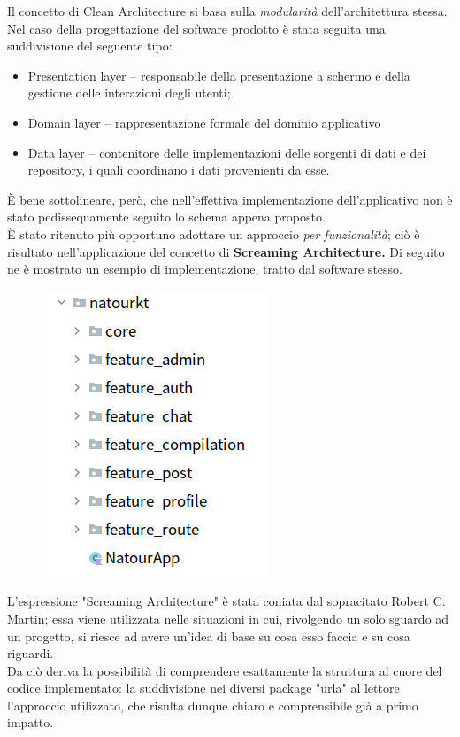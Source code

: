 \documentclass{natourDoc}
\begin{document}
Il concetto di Clean Architecture si basa sulla \textit{modularità} dell’architettura stessa. \\
Nel caso della progettazione del software prodotto è stata seguita una suddivisione del seguente tipo:
\begin{itemize}
	\item Presentation layer – responsabile della presentazione a schermo e della gestione delle
	      interazioni degli utenti;
	\item Domain layer – rappresentazione formale del dominio applicativo
	\item Data layer – contenitore delle implementazioni delle sorgenti di dati e dei repository,
	      i quali coordinano i dati provenienti da esse.
\end{itemize}

È bene sottolineare, però, che nell'effettiva implementazione dell'applicativo non è
stato pedissequamente seguito lo schema appena proposto. \\
È stato ritenuto più opportuno adottare un approccio \textit{per funzionalità}; ciò è risultato nell'applicazione del concetto di \textbf{Screaming Architecture.} Di seguito ne
è mostrato un esempio di implementazione, tratto dal software stesso. \\
\begin{figure}[!htbp]
	\centering
	\includegraphics{./diagrams/design/screaming.png}
\end{figure}
\FloatBarrier
L'espressione "Screaming Architecture" è stata coniata dal sopracitato Robert C. Martin; essa viene utilizzata nelle situazioni in cui,
rivolgendo un solo sguardo ad un progetto, si riesce ad avere un'idea di base su cosa esso faccia e su cosa riguardi. \\
Da ciò deriva la possibilità di comprendere esattamente la struttura al cuore del codice implementato:
la suddivisione nei diversi package "urla" al lettore l'approccio utilizzato, che risulta dunque chiaro e comprensibile già a primo impatto.\\
\end{document}
